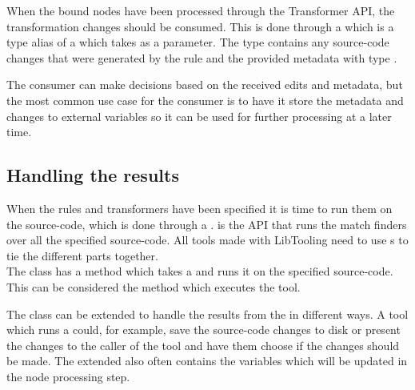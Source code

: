 When the bound nodes have been processed through the Transformer API, the transformation changes should be consumed. This is done through a  which is a type alias of a  which takes  as a parameter. The  type contains any source-code changes that were generated by the rule and the provided metadata with type .

The consumer can make decisions based on the received edits and metadata, but the most common use case for the consumer is to have it store the metadata and changes to external variables so it can be used for further processing at a later time.

\subsection{Handling the results} \label{subsec:080dev:HandlingToolResults}
When the rules and transformers have been specified it is time to run them on the source-code, which is done through a .  is the API that runs the match finders over all the specified source-code.
All tools made with LibTooling need to use s to tie the different parts together.\\
The  class has a  method which takes a  and runs it on the specified source-code.
This can be considered the method which executes the tool.

The  class can be extended to handle the results from the  in different ways. A tool which runs a  could, for example, save the source-code changes to disk or present the changes to the caller of the tool and have them choose if the changes should be made. The extended  also often contains the variables which will be updated in the node processing step.